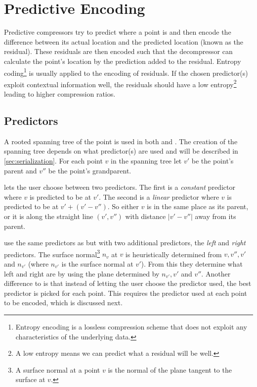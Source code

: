 \documentclass{report}
\begin{document}
\section{Predictive Encoding}

Predictive compressors try to predict where a point is and then encode the
difference between its actual location and the predicted location (known as
the residual). These residuals are then encoded such that the decompressor can
calculate the point's location by the prediction added to the
residual. Entropy coding\footnote{Entropy encoding is a lossless compression
  scheme that does not exploit any characteristics of the underlying data.} is
usually applied to the encoding of residuals. If the chosen predictor(s)
exploit contextual information well, the residuals should have a low
entropy\footnote{A low entropy means we can predict what a residual will be
  well.}  leading to higher compression ratios.


\subsection{Predictors}

A rooted spanning tree of the point is used in both \citep{gumholdcomp} and
\citep{merrycomp}. The creation of the spanning tree depends on what
predictor(s) are used and will be described in \ref{sec:serialization}. For
each point $v$ in the spanning tree let $v'$ be the point's parent and $v''$
be the point's grandparent.

\citet{gumholdcomp} lets the user choose between two predictors. The first is
a \emph{constant} predictor where $v$ is predicted to be at $v'$. The second
is a \emph{linear} predictor where $v$ is predicted to be at $v' + (v' -
v'')$. So either $v$ is in the same place as its parent, or it is along the
straight line $(v', v'')$ with distance $|v'-v''|$ away from its parent.

\citet{merrycomp} use the same predictors as \citep{gumholdcomp} but with two
additional predictors, the \emph{left} and \emph{right} predictors. The
surface normal\footnote{A surface normal at a point $v$ is the normal of the
  plane tangent to the surface at $v$.} $n_v$ at $v$ is heuristically
determined from $v, v'', v'$ and $n_{v'}$ (where $n_{v'}$ is the surface
normal at $v'$). From this they determine what left and right are by using the
plane determined by $n_{v'}, v'$ and $v''$. Another difference to
\citep{gumholdcomp} is that instead of letting the user choose the
predictor used, the best predictor is picked for each point. This requires the
predictor used at each point to be encoded, which is discussed next.
\end{document}

